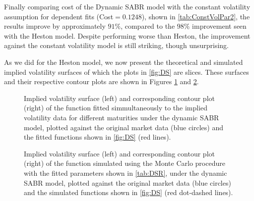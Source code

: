 Finally comparing cost of the Dynamic SABR model with the constant volatility assumption for dependent fits (Cost$=0.1248$), shown in \autoref{tab:ConstVolPar2}, the results improve by approximately $91\%$, compared to the $98\%$ improvement seen with the Heston model. Despite performing worse than Heston, the improvement against the constant volatility model is still striking, though unsurprising.

As we did for the Heston model, we now present the theoretical and simulated implied volatility surfaces of which the plots in \autoref{fig:DS} are slices. 
These surfaces and their respective contour plots are shown in Figures \ref{fig:DSS} and \ref{fig:DSSSim}.



\begin{figure}[H]
  \begin{subfigmatrix}{2}
  \end{subfigmatrix}
    \caption[Implied volatility surface and corresponding contour plot of the function fitted simmultaneously to the implied volatility data for different maturities under the dynamic SABR model, plotted against the original market data and the fitted functions shown in \autoref{fig:DS}.]{Implied volatility surface (left) and corresponding contour plot (right) of the function fitted simmultaneously to the implied volatility data for different maturities under the dynamic SABR model, plotted against the original market data (blue circles) and the fitted functions shown in \autoref{fig:DS} (red lines).}\label{fig:DSS}
\end{figure}   


\begin{figure}[H]
  \begin{subfigmatrix}{2}
  \end{subfigmatrix}
    \caption[Implied volatility surface and corresponding contour plot of the function simulated using the Monte Carlo procedure with the fitted parameters shown in \autoref{tab:DSR}, under the dynamic SABR model, plotted against the original market data and the simulated functions shown in \autoref{fig:DS}.]{Implied volatility surface (left) and corresponding contour plot (right) of the function simulated using the Monte Carlo procedure with the fitted parameters shown in \autoref{tab:DSR}, under the dynamic SABR model, plotted against the original market data (blue circles) and the simulated functions shown in \autoref{fig:DS} (red dot-dashed lines).}\label{fig:DSSSim}
\end{figure} 



